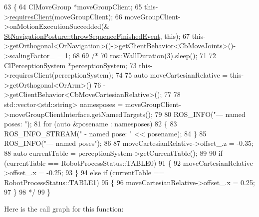\begin{DoxyCode}
63     \{
64         ClMoveGroup *moveGroupClient;
65         this->\hyperlink{classsmacc_1_1ISmaccState_a7f95c9f0a6ea2d6f18d1aec0519de4ac}{requiresClient}(moveGroupClient);
66         moveGroupClient->onMotionExecutionSuccedded(&
      \hyperlink{classsmacc_1_1SmaccState_a49dcfc25824f7e083dd4b999c49ab2b6}{StNavigationPosture::throwSequenceFinishedEvent}, \textcolor{keyword}{this});
67         this->getOrthogonal<OrNavigation>()->getClientBehavior<CbMoveJoints>()->scalingFactor\_ = 1;
68 
69         \textcolor{comment}{/*}
70 \textcolor{comment}{        ros::WallDuration(3).sleep();}
71 \textcolor{comment}{}
72 \textcolor{comment}{        ClPerceptionSystem *perceptionSystem;}
73 \textcolor{comment}{        this->requiresClient(perceptionSystem);}
74 \textcolor{comment}{}
75 \textcolor{comment}{        auto moveCartesianRelative = this->getOrthogonal<OrArm>()}
76 \textcolor{comment}{                                         ->getClientBehavior<CbMoveCartesianRelative>();}
77 \textcolor{comment}{}
78 \textcolor{comment}{        std::vector<std::string> namesposes = moveGroupClient->moveGroupClientInterface.getNamedTargets();}
79 \textcolor{comment}{}
80 \textcolor{comment}{        ROS\_INFO("--- named poses: ");}
81 \textcolor{comment}{        for (auto &posename : namesposes)}
82 \textcolor{comment}{        \{}
83 \textcolor{comment}{            ROS\_INFO\_STREAM(" - named pose: " << posename);}
84 \textcolor{comment}{        \}}
85 \textcolor{comment}{        ROS\_INFO("--- named poses");}
86 \textcolor{comment}{}
87 \textcolor{comment}{        moveCartesianRelative->offset\_.z = -0.35;}
88 \textcolor{comment}{        auto currentTable = perceptionSystem->getCurrentTable();}
89 \textcolor{comment}{}
90 \textcolor{comment}{        if (currentTable == RobotProcessStatus::TABLE0)}
91 \textcolor{comment}{        \{}
92 \textcolor{comment}{            moveCartesianRelative->offset\_.x = -0.25;}
93 \textcolor{comment}{        \}}
94 \textcolor{comment}{        else if (currentTable == RobotProcessStatus::TABLE1)}
95 \textcolor{comment}{        \{}
96 \textcolor{comment}{            moveCartesianRelative->offset\_.x = 0.25;}
97 \textcolor{comment}{        \}}
98 \textcolor{comment}{    */}
99     \}
\end{DoxyCode}
Here is the call graph for this function\+:
\nopagebreak
